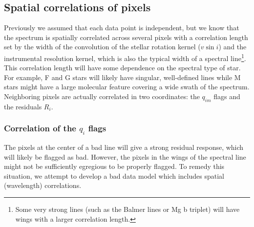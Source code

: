 \documentclass[preprint]{aastex} %
\begin{document}
\subsection{Spatial correlations of pixels}
Previously we assumed that each data point is independent, but we know that the spectrum is spatially correlated across several pixels with a correlation length set by the width of the convolution of the stellar rotation kernel ($v \sin i$) and the instrumental resolution kernel, which is also the typical width of a spectral line\footnote{Some very strong lines (such as the Balmer lines or Mg b triplet) will have wings with a larger correlation length.}. This correlation length will have some dependence on the spectral type of star. For example, F and G stars will likely have singular, well-defined lines while M stars might have a large molecular feature covering a wide swath of the spectrum. Neighboring pixels are actually correlated in two coordinates: the $q_{im}$ flags and the residuals $R_i$. 

\subsubsection{Correlation of the $q_i$ flags}
The pixels at the center of a bad line will give a strong residual response, which will likely be flagged as bad. However, the pixels in the wings of the spectral line might not be sufficiently egregious to be properly flagged. To remedy this situation, we attempt to develop a bad data model which includes spatial (wavelength) correlations.
\end{document}
